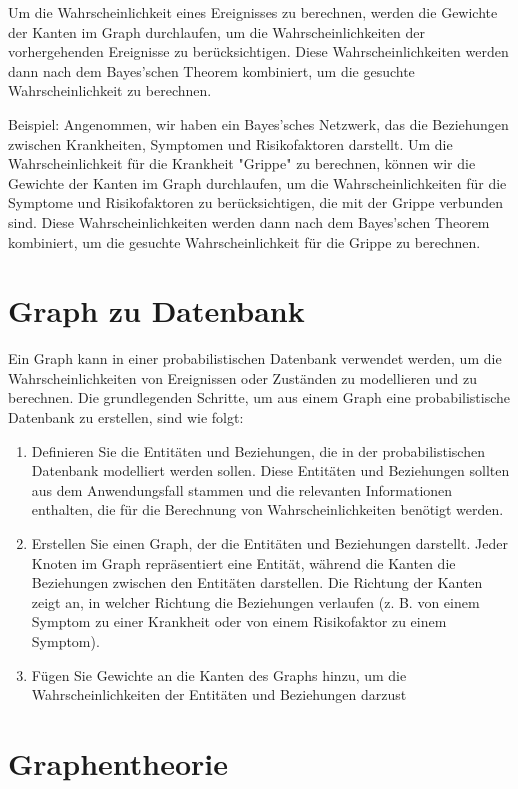Um die Wahrscheinlichkeit eines Ereignisses zu berechnen, werden die Gewichte der Kanten im Graph durchlaufen, um die Wahrscheinlichkeiten der vorhergehenden Ereignisse zu berücksichtigen. Diese Wahrscheinlichkeiten werden dann nach dem Bayes'schen Theorem kombiniert, um die gesuchte Wahrscheinlichkeit zu berechnen.

Beispiel: Angenommen, wir haben ein Bayes'sches Netzwerk, das die Beziehungen zwischen Krankheiten, Symptomen und Risikofaktoren darstellt. Um die Wahrscheinlichkeit für die Krankheit "Grippe" zu berechnen, können wir die Gewichte der Kanten im Graph durchlaufen, um die Wahrscheinlichkeiten für die Symptome und Risikofaktoren zu berücksichtigen, die mit der Grippe verbunden sind. Diese Wahrscheinlichkeiten werden dann nach dem Bayes'schen Theorem kombiniert, um die gesuchte Wahrscheinlichkeit für die Grippe zu berechnen.


\section{Graph zu Datenbank}
Ein Graph kann in einer probabilistischen Datenbank verwendet werden, um die Wahrscheinlichkeiten von Ereignissen oder Zuständen zu modellieren und zu berechnen. Die grundlegenden Schritte, um aus einem Graph eine probabilistische Datenbank zu erstellen, sind wie folgt:

\begin{enumerate}
	\item Definieren Sie die Entitäten und Beziehungen, die in der probabilistischen Datenbank modelliert werden sollen. Diese Entitäten und Beziehungen sollten aus dem Anwendungsfall stammen und die relevanten Informationen enthalten, die für die Berechnung von Wahrscheinlichkeiten benötigt werden.
	
	\item Erstellen Sie einen Graph, der die Entitäten und Beziehungen darstellt. Jeder Knoten im Graph repräsentiert eine Entität, während die Kanten die Beziehungen zwischen den Entitäten darstellen. Die Richtung der Kanten zeigt an, in welcher Richtung die Beziehungen verlaufen (z. B. von einem Symptom zu einer Krankheit oder von einem Risikofaktor zu einem Symptom).
	
	\item Fügen Sie Gewichte an die Kanten des Graphs hinzu, um die Wahrscheinlichkeiten der Entitäten und Beziehungen darzust
\end{enumerate}

\section{Graphentheorie}
